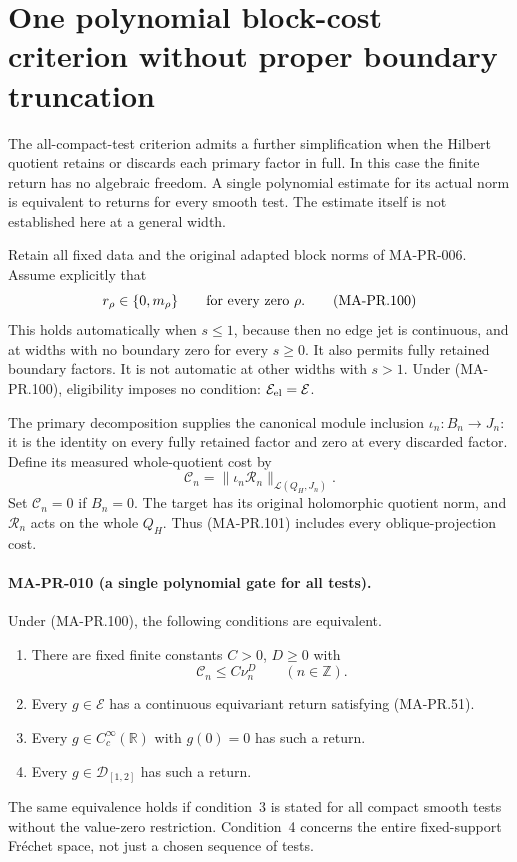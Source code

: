 \section{One polynomial block-cost criterion without proper boundary truncation}
\label{sec:polynomial-partial-return}

The all-compact-test criterion admits a further simplification
when the Hilbert quotient retains or discards each primary
factor in full.  In this case the finite return has no
algebraic freedom.  A single polynomial estimate for its
actual norm is equivalent to returns for every smooth test.
The estimate itself is not established here at a general width.

Retain all fixed data and the original adapted block norms
of MA-PR-006.  Assume explicitly that
\[
                 r_\rho\in\{0,m_\rho\}
                    \qquad\hbox{for every zero }\rho.
 \tag{MA-PR.100}
\]
This holds automatically when \(s\le1\), because then
no edge jet is continuous, and at widths with no boundary
zero for every \(s\ge0\).  It also permits fully retained
boundary factors.  It is not automatic at other widths
with \(s>1\).  Under (MA-PR.100), eligibility imposes
no condition: \(\mathcal E_{\rm el}=\mathcal E\).

The primary decomposition supplies the canonical module
inclusion \(\iota_n:B_n\to J_n\): it is the identity
on every fully retained factor and zero at every
discarded factor.  Define its measured whole-quotient cost by
\[
       \mathcal C_n
           =\|\iota_n\mathscr R_n\|_{\mathcal L(Q_H,J_n)}.
 \tag{MA-PR.101}
\]
Set \(\mathcal C_n=0\) if \(B_n=0\).
The target has its original holomorphic quotient norm,
and \(\mathscr R_n\) acts on the whole \(Q_H\).
Thus (MA-PR.101) includes every oblique-projection cost.

\paragraph{MA-PR-010 (a single polynomial gate for all tests).}
Under (MA-PR.100), the following conditions are equivalent.
\begin{enumerate}
\item There are fixed finite constants \(C>0\), \(D\ge0\) with
\[
                \mathcal C_n\le C\nu_n^D
                           \qquad(n\in\mathbb Z).
 \tag{MA-PR.102}
\]
\item Every \(g\in\mathcal E\) has a continuous
equivariant return satisfying (MA-PR.51).
\item Every \(g\in C_c^\infty(\mathbb R)\) with
\(g(0)=0\) has such a return.
\item Every \(g\in\mathcal D_{[1,2]}\) has such a return.
\end{enumerate}
The same equivalence holds if condition~3 is stated
for all compact smooth tests without the value-zero
restriction.  Condition~4 concerns the entire fixed-support
Fr\'echet space, not just a chosen sequence of tests.

